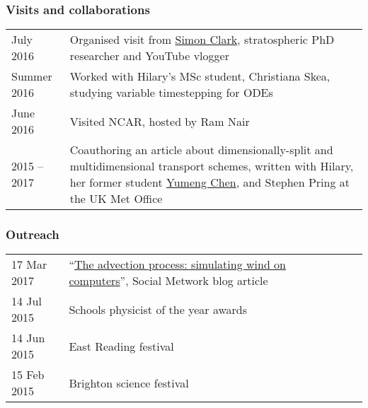 \documentclass[a4paper,11pt]{article}
\begin{document}
\subsubsection*{Visits and collaborations}
\begin{tabularx}{\linewidth}{l X}
July 2016 & Organised visit from \href{https://www.youtube.com/user/SimonOxfPhys}{Simon Clark}, stratospheric PhD researcher and YouTube vlogger \\
Summer 2016 & Worked with Hilary's MSc student, Christiana Skea, studying variable timestepping for ODEs \\
June 2016 & Visited NCAR, hosted by Ram Nair \\
2015 -- 2017 & Coauthoring an article about dimensionally-split and multidimensional transport schemes, written with Hilary, her former student \href{https://www.clisap.de/research/a:-climate-dynamics-and-variability/crg-numerical-methods-in-geosciences/team-members/yumeng-chen/}{Yumeng Chen}, and Stephen Pring at the UK Met Office \\
\end{tabularx}

\subsubsection*{Outreach}
\begin{tabular}{l l l}
17 Mar 2017 & ``\href{https://thesocialmetwork.wordpress.com/2017/03/17/simulating-wind-on-computers/}{The advection process: simulating wind on computers}'', Social Metwork blog article \\
14 Jul 2015 & Schools physicist of the year awards \\
14 Jun 2015 & East Reading festival \\
15 Feb 2015 & Brighton science festival \\
\end{tabular}
\end{document}
